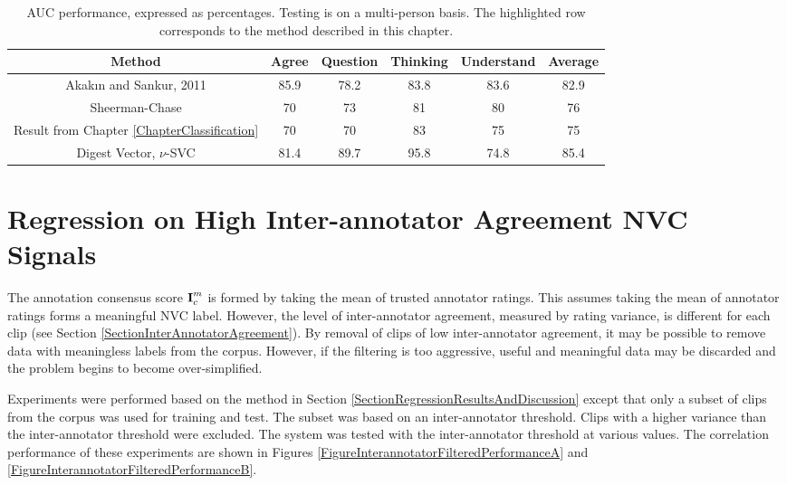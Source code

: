 \begin{table}[tb]
\centering
\caption{\ac{AUC} performance, expressed as percentages. Testing is on a multi-person basis. The highlighted row corresponds to the method described in this chapter.}
\scriptsize 
\begin{tabular}{ c || c | c | c | c | c }
Method & Agree & Question & Thinking & Understand & Average \\
\hline
Akak{\i}n and Sankur, 2011 \cite{Akakin2011} & 85.9 & 78.2 & 83.8 & 83.6 & 82.9 \\
Sheerman-Chase \etal 2009 \cite{SheermanChase2009} & 70 & 73 & 81 & 80 & 76 \\
Result from Chapter \ref{ChapterClassification} & 70 & 70 & 83 & 75 & 75 \\
\hline
\cellcolor[gray]{0.8}Digest Vector, $\nu$-SVC & \cellcolor[gray]{0.8}81.4 & \cellcolor[gray]{0.8}89.7 & \cellcolor[gray]{0.8}95.8  & \cellcolor[gray]{0.8}74.8 & \cellcolor[gray]{0.8}85.4
\end{tabular}
\normalsize
\label{TableDigestMethodOnClassification}
\end{table}

\section{Regression on High Inter-annotator Agreement \ac{NVC} Signals}
\label{SectionRegressionHighAgreement}

The annotation consensus score $\textbf{I}^{m}_{c}$ is formed by taking the mean of trusted annotator ratings. This assumes taking the mean of annotator ratings forms a meaningful \ac{NVC} label. However, the level of inter-annotator agreement, measured by rating variance, is different for each clip (see Section \ref{SectionInterAnnotatorAgreement}). By removal of clips of low inter-annotator agreement, it may be possible to remove data with meaningless labels from the corpus. However, if the filtering is too aggressive, useful and meaningful data may be discarded and the problem begins to become over-simplified.

Experiments were performed based on the method in Section \ref{SectionRegressionResultsAndDiscussion} except that only a subset of clips from the corpus was used for training and test. The subset was based on an inter-annotator threshold. Clips with a higher variance than the inter-annotator threshold were excluded. The system was tested with the inter-annotator threshold at various values. The correlation performance of these experiments are shown in Figures \ref{FigureInterannotatorFilteredPerformanceA} and \ref{FigureInterannotatorFilteredPerformanceB}.

